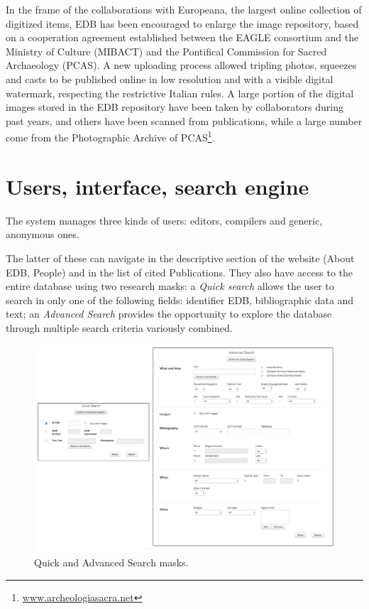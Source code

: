 \documentclass[amsthm,ebook]{saparticle}
\begin{document}
In the frame of the collaborations with Europeana, the largest online collection of digitized items, EDB has been
encouraged to enlarge the image repository, based on a cooperation agreement established between the EAGLE consortium
and the Ministry of Culture (MIBACT) and the Pontifical Commission for Sacred Archaeology (PCAS). A new uploading
process allowed tripling photos, squeezes and casts to be published online in low resolution and with a visible digital
watermark, respecting the restrictive Italian rules. A large portion of the digital images stored in the EDB repository
have been taken by collaborators during past years, and others have been scanned from publications, while a large
number come from the Photographic Archive of PCAS\footnote{ \url{www.archeologiasacra.net}}.




\section{Users, interface, search engine}





The system manages three kinds of users: editors, compilers and generic, anonymous ones.

The latter of these can navigate in the descriptive section of the website (About EDB, People) and in the list of cited
Publications. They also have access to the entire database using two research masks: a \emph{Quick search} allows the user to
search in only one of the following fields: identifier EDB, bibliographic data and text; an \emph{Advanced Search} provides
the opportunity to explore the database through multiple search criteria variously combined.

\begin{figure}[!hbp]
\centering
 \includegraphics[width=\columnwidth]{EAGLE2016Roccoengrev-img011.png}
\caption{Quick and Advanced Search masks.}
\label{fig:11}
\end{figure}
 
\end{document}
